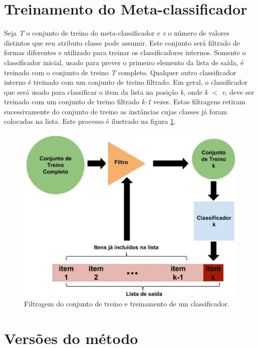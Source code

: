 \documentclass[dissertacao,brazil]{ThesisPUC}
\begin{document}
\section{Treinamento do Meta-classificador}

Seja \textit{T} o conjunto de treino do meta-classificador e \textit{v} o número de valores distintos que seu atributo classe pode assumir. Este conjunto será filtrado de formas diferentes e utilizado para treinar os classificadores internos. Somente o classificador inicial, usado para prever o primeiro elemento da lista de saída, é treinado com o conjunto de treino \textit{T} completo. Qualquer outro classificador interno é treinado com um conjunto de treino filtrado. Em geral, o classificador que será usado para classificar o item da lista na posição \textit{k}, onde \textit{k} $<$ \textit{v}, deve ser treinado com um conjunto de treino filtrado \textit{k-1} vezes. Estas filtragens retiram sucessivamente do conjunto de treino as instâncias cujas classes já foram colocadas na lista. Este processo é ilustrado na figura \ref{fig:metodoproposto02}.

\begin{figure}[h!]
  \includegraphics[width=\linewidth]{images/metodoproposto02.eps}
  \caption{Filtragem do conjunto de treino e treinamento de um classificador.}
  \label{fig:metodoproposto02}
\end{figure}

\section{Versões do método}
\end{document}

